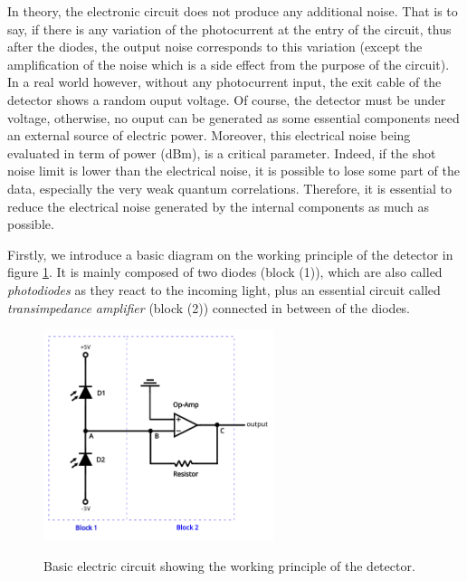 \documentclass[11pt]{report}
\begin{document}
In theory, the electronic circuit does not produce any additional noise. That is to say, if there is any variation of the photocurrent at the entry of the circuit, thus after the diodes, the output noise corresponds to this variation (except the amplification of the noise which is a side effect from the purpose of the circuit). In a real world however, without any photocurrent input, the exit cable of the detector shows a random ouput voltage. Of course, the detector must be under voltage, otherwise, no ouput can be generated as some essential components need an external source of electric power. Moreover, this electrical noise being evaluated in term of power (dBm), is a critical parameter. Indeed, if the shot noise limit is lower than the electrical noise, it is possible to lose some part of the data, especially the very weak quantum correlations. Therefore, it is essential to reduce the electrical noise generated by the internal components as much as possible.

Firstly, we introduce a basic diagram on the working principle of the detector in figure \ref{fig:detector-fst}. It is mainly composed of two diodes (block (1)), which are also called \textit{photodiodes} as they react to the incoming light, plus an essential circuit called \textit{transimpedance amplifier} (block (2)) connected in between of the diodes.

\begin{figure}[h!]
\caption{Basic electric circuit showing the working principle of the detector.}
\centering
\includegraphics[width=0.6\textwidth]{detector-fst}
\label{fig:detector-fst}
\end{figure}
\end{document}
